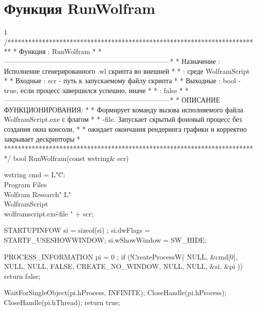 \pagebreak

\section{Функция RunWolfram}
\footnotesize
\begin{listing}{1}
/*************************************************************************
* Функция        : RunWolfram                                            *
*------------------------------------------------------------------------*
* Назначение     : Исполнение сгенерированного .wl скрипта во внешней    *
*                : среде WolframScript                                   *
* Входные        : scr - путь к запускаемому файлу скрипта               *
* Выходные       : bool - true, если процесс завершился успешно, иначе   *
*                : false                                                 *
*------------------------------------------------------------------------*
* ОПИСАНИЕ ФУНКЦИОНИРОВАНИЯ:                                             *
* Формирует команду вызова исполняемого файла WolframScript.exe с флагом *
* -file. Запускает скрытый фоновый процесс без создания окна консоли,    *
* ожидает окончания рендеринга графики и корректно закрывает дескрипторы *
*************************************************************************/
bool RunWolfram(const wstring& scr) {
    wstring cmd = L"\"C:\\Program Files\\Wolfram Research"
        L"\\WolframScript\\wolframscript.exe\" -file " + scr;
    
    STARTUPINFOW si = { sizeof(si) };
    si.dwFlags = STARTF_USESHOWWINDOW;
    si.wShowWindow = SW_HIDE;
    
    PROCESS_INFORMATION pi = { 0 };
    if (!CreateProcessW(
        NULL, &cmd[0], NULL, NULL, FALSE,
        CREATE_NO_WINDOW, NULL, NULL, &si, &pi
    )) return false;
    
    WaitForSingleObject(pi.hProcess, INFINITE);
    CloseHandle(pi.hProcess);
    CloseHandle(pi.hThread);
    return true;
}
\end{listing}
\normalsize

\pagebreak

